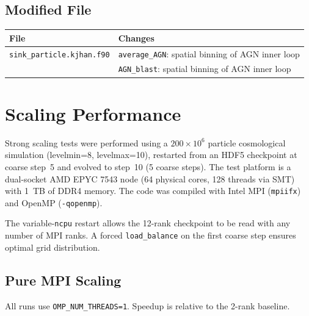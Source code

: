 \documentclass[11pt,fleqn]{book}
\begin{document}
\section{Modified File}

\begin{center}
\begin{tabular}{lp{8cm}}
\toprule
\textbf{File} & \textbf{Changes} \\
\midrule
\texttt{sink\_particle.kjhan.f90} & \texttt{average\_AGN}: spatial binning of AGN inner loop \\
                                   & \texttt{AGN\_blast}: spatial binning of AGN inner loop \\
\bottomrule
\end{tabular}
\end{center}


\chapter{Scaling Performance}
\label{ch:scaling}

Strong scaling tests were performed using a $200 \times 10^6$ particle cosmological simulation (levelmin=8, levelmax=10), restarted from an HDF5 checkpoint at coarse step~5 and evolved to step~10 (5 coarse steps). The test platform is a dual-socket AMD EPYC 7543 node (64 physical cores, 128 threads via SMT) with 1~TB of DDR4 memory. The code was compiled with Intel MPI (\texttt{mpiifx}) and OpenMP (\texttt{-qopenmp}).

The variable-\texttt{ncpu} restart allows the 12-rank checkpoint to be read with any number of MPI ranks. A forced \texttt{load\_balance} on the first coarse step ensures optimal grid distribution.

\section{Pure MPI Scaling}

All runs use \texttt{OMP\_NUM\_THREADS=1}.  Speedup is relative to the 2-rank baseline.
\end{document}
